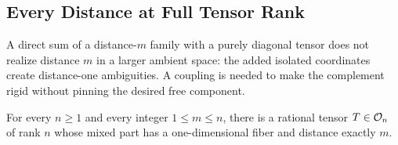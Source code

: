 \subsection{Every Distance at Full Tensor Rank}
A direct sum of a distance-$m$ family with a purely diagonal tensor does not realize distance $m$ in a larger ambient space: the added isolated coordinates create distance-one ambiguities. A coupling is needed to make the complement rigid without pinning the desired free component.

\begin{theorem}\label{thm:all-distances}
For every $n\ge1$ and every integer $1\le m\le n$, there is a rational tensor $T\in\mathcal O_n$ of rank $n$ whose mixed part has a one-dimensional fiber and distance exactly $m$.
\end{theorem}
